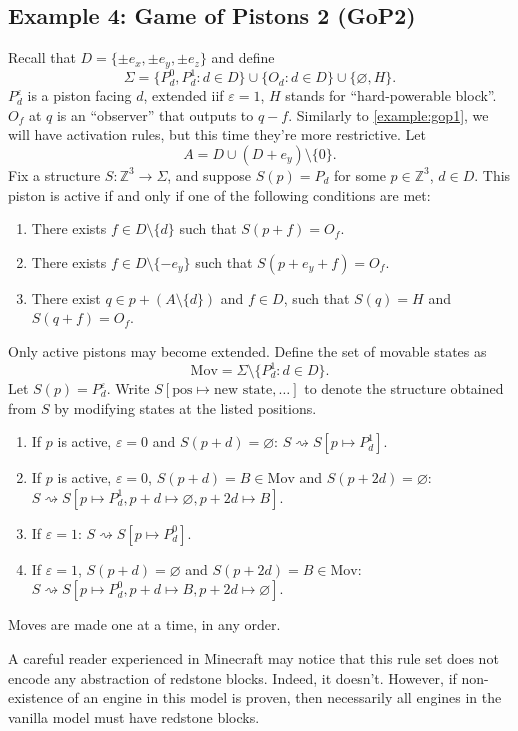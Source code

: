 \documentclass[12pt]{article}
\newcommand{\Z}{\mathbb{Z}}
\newcommand{\eps}{\varepsilon}
\theoremstyle{remark}
\theoremstyle{definition}
\begin{document}
\subsection{Example 4: Game of Pistons 2 (GoP2)} \label{example:gop2}
Recall that $D=\{\pm e_x, \pm e_y, \pm e_z\}$ and define
$$\Sigma=\{P_d^0, P_d^1 : d \in D\} \cup \{O_d : d \in D\} \cup \{\varnothing, H\}.$$
$P_d^\eps$ is a piston facing $d$, extended iif $\eps=1$, $H$ stands for ``hard-powerable block''.
$O_f$ at $q$ is an ``observer'' that outputs to $q-f$. Similarly to \ref{example:gop1}, we will have activation rules, but this time they're more restrictive. Let
$$A=D\cup(D+e_y)\setminus\{0\}.$$
Fix a structure $S: \Z^3\to\Sigma$, and suppose $S(p)=P_d$ for some $p\in\Z^3$, $d\in D$.
This piston is active if and only if one of the following conditions are met:
\begin{enumerate}
    \item There exists $f\in D\setminus\{d\}$ such that $S(p+f)=O_f$.
    \item There exists $f\in D\setminus\{-e_y\}$ such that $S(p+e_y+f)=O_f$.
    \item There exist $q\in p+(A\setminus\{d\})$ and $f\in D$, such that $S(q)=H$ and $S(q+f)=O_f$.
\end{enumerate}
Only active pistons may become extended. Define the set of movable states as
$$\text{Mov}=\Sigma\setminus\{P_d^1 : d \in D\}.$$
Let $S(p)=P_d^\eps$. Write $S[\text{pos}\mapsto\text{new state}, \dots]$ to denote the structure obtained from $S$ by modifying states at the listed positions.
\begin{enumerate}
    \item[(E1)] If $p$ is active, $\eps=0$ and $S(p+d)=\varnothing$: $S\rightsquigarrow S[p\mapsto P_d^1]$.
    \item[(E2)] If $p$ is active, $\eps=0$, $S(p+d)=B\in\text{Mov}$ and $S(p+2d)=\varnothing$: $S\rightsquigarrow S[p\mapsto P_d^1, p+d\mapsto\varnothing, p+2d\mapsto B]$.
    \item[(R1)] If $\eps=1$: $S\rightsquigarrow S[p\mapsto P_d^0]$.
    \item[(R2)] If $\eps=1$, $S(p+d)=\varnothing$ and $S(p+2d)=B\in\text{Mov}$: $S\rightsquigarrow S[p\mapsto P_d^0, p+d\mapsto B, p+2d\mapsto\varnothing]$.
\end{enumerate}
Moves are made one at a time, in any order.

A careful reader experienced in Minecraft may notice that this rule set does not encode any abstraction of redstone blocks. Indeed, it doesn't.
However, if non-existence of an engine in this model is proven, then necessarily all engines in the vanilla model must have redstone blocks.
\end{document}
